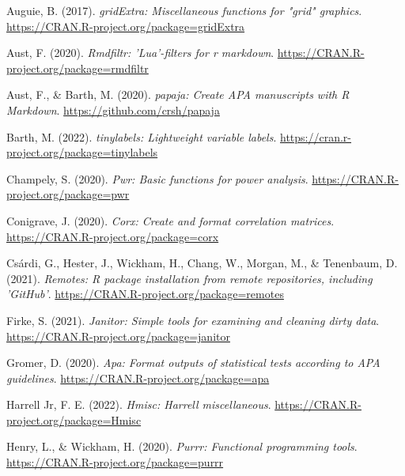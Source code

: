 \documentclass[
  man,floatsintext]{apa7}
\newlength{\cslhangindent}
\newlength{\cslentryspacingunit} %
\newenvironment{CSLReferences}[2] %
 {%
  \setlength{\parindent}{0pt}
  \ifodd #1
  \let\oldpar\par
  \def\par{\hangindent=\cslhangindent\oldpar}
  \fi
  \setlength{\parskip}{#2\cslentryspacingunit}
 }%
 {}
\begin{document}
\hypertarget{refs}{}
\begin{CSLReferences}{1}{0}
\leavevmode{}%
Auguie, B. (2017). \emph{gridExtra: Miscellaneous functions for "grid" graphics}. \url{https://CRAN.R-project.org/package=gridExtra}

\leavevmode{}%
Aust, F. (2020). \emph{Rmdfiltr: 'Lua'-filters for r markdown}. \url{https://CRAN.R-project.org/package=rmdfiltr}

\leavevmode{}%
Aust, F., \& Barth, M. (2020). \emph{{papaja}: {Create} {APA} manuscripts with {R Markdown}}. \url{https://github.com/crsh/papaja}

\leavevmode{}%
Barth, M. (2022). \emph{{tinylabels}: Lightweight variable labels}. \url{https://cran.r-project.org/package=tinylabels}

\leavevmode{}%
Champely, S. (2020). \emph{Pwr: Basic functions for power analysis}. \url{https://CRAN.R-project.org/package=pwr}

\leavevmode{}%
Conigrave, J. (2020). \emph{Corx: Create and format correlation matrices}. \url{https://CRAN.R-project.org/package=corx}

\leavevmode{}%
Csárdi, G., Hester, J., Wickham, H., Chang, W., Morgan, M., \& Tenenbaum, D. (2021). \emph{Remotes: R package installation from remote repositories, including 'GitHub'}. \url{https://CRAN.R-project.org/package=remotes}

\leavevmode{}%
Firke, S. (2021). \emph{Janitor: Simple tools for examining and cleaning dirty data}. \url{https://CRAN.R-project.org/package=janitor}

\leavevmode{}%
Gromer, D. (2020). \emph{Apa: Format outputs of statistical tests according to APA guidelines}. \url{https://CRAN.R-project.org/package=apa}

\leavevmode{}%
Harrell Jr, F. E. (2022). \emph{Hmisc: Harrell miscellaneous}. \url{https://CRAN.R-project.org/package=Hmisc}

\leavevmode{}%
Henry, L., \& Wickham, H. (2020). \emph{Purrr: Functional programming tools}. \url{https://CRAN.R-project.org/package=purrr}


\end{CSLReferences}
\end{document}

